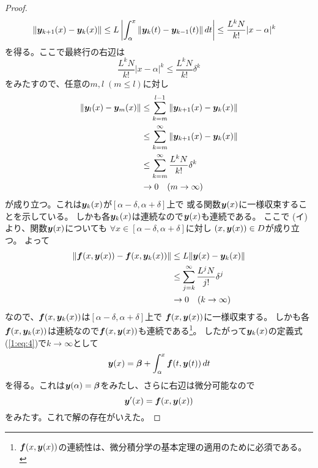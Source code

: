 \documentclass[report]{jlreq}
\begin{document}
\begin{proof}
\begin{equation}
\begin{split}
            \| \bm{y}_{k+1}(x) - \bm{y}_k(x) \|
                &\le L \left| \int_\alpha^x \| \bm{y}_{k}(t) - \bm{y}_{k-1}(t) \|\, dt \right|
                \le \frac{L^k N}{k!} |x - \alpha|^k
        \end{split}
    \end{equation}
    を得る。ここで最終行の右辺は
    \begin{equation}
        \frac{L^k N}{k!} |x - \alpha|^k
            \le \frac{L^k N}{k!} \delta^k
    \end{equation}
    をみたすので、任意の$m, l\; (m \le l)$に対し
    \begin{equation}
        \begin{split}
            \| \bm{y}_l(x) - \bm{y}_m(x) \|
                &\le \sum_{k = m}^{l - 1} \| \bm{y}_{k+1}(x) - \bm{y}_k(x) \| \\
                &\le \sum_{k = m}^{\infty} \| \bm{y}_{k+1}(x) - \bm{y}_k(x) \| \\
                &\le \sum_{k = m}^{\infty} \frac{L^k N}{k!} \delta^k \\
                &\to 0 \quad (m \to \infty)
        \end{split}
    \end{equation}
    が成り立つ。これは$\bm{y}_k(x)$が$[\alpha - \delta, \alpha + \delta]$上で
    或る関数$\bm{y}(x)$に一様収束することを示している。
    しかも各$\bm{y}_k(x)$は連続なので$\bm{y}(x)$も連続である。
    ここで (イ) より、関数$\bm{y}(x)$についても
    $\forall x \in [\alpha - \delta, \alpha + \delta]$に対し
    $(x, \bm{y}(x)) \in D$が成り立つ。
    よって
    \begin{equation}
        \begin{split}
            \| \bm{f}(x, \bm{y}(x)) - \bm{f}(x, \bm{y}_k(x)) \|
                &\le L \| \bm{y}(x) - \bm{y}_k(x) \| \\
                &\le \sum_{j = k}^{\infty} \frac{L^j N}{j!} \delta^j \\
                &\to 0 \quad (k \to \infty)
        \end{split}
    \end{equation}
    なので、$\bm{f}(x, \bm{y}_k(x))$は$[\alpha - \delta, \alpha + \delta]$上で
    $\bm{f}(x, \bm{y}(x))$に一様収束する。
    しかも各$\bm{f}(x, \bm{y}_k(x))$は連続なので$\bm{f}(x, \bm{y}(x))$も連続である\footnote{
        $\bm{f}(x, \bm{y}(x))$の連続性は、微分積分学の基本定理の適用のために必須である。
    }。
    したがって$\bm{y}_k(x)$の定義式(\ref{1:eq:4})で$k \to \infty$として
    \begin{equation}
        \bm{y}(x) = \bm{\beta} + \int_\alpha^x \bm{f}(t, \bm{y}(t))\, dt
    \end{equation}
    を得る。これは$\bm{y}(\alpha) = \bm{\beta}$をみたし、さらに右辺は微分可能なので
    \begin{equation}
        \bm{y}'(x) = \bm{f}(x, \bm{y}(x))
    \end{equation}
    をみたす。これで解の存在がいえた。
\end{proof}
\end{document}
